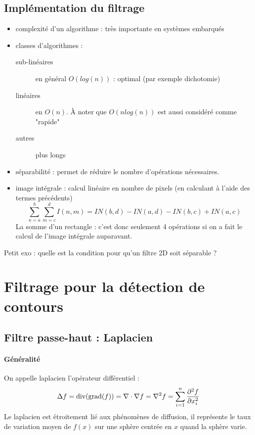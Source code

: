 \documentclass[main.tex]{subfiles}
\begin{document}
\subsection{Implémentation du filtrage}
\begin{itemize}
\item complexité d'un algorithme : très importante en systèmes embarqués
\item classes d'algorithmes :
\begin{description}
\item[sub-linéaires] en général $O(log(n))$ : optimal (par exemple dichotomie)
\item[linéaires] en $O(n)$. À noter que $O(nlog(n))$ est aussi considéré comme "rapide"
\item[autres] plus longs
\end{description}
\item séparabilité : permet de réduire le nombre d'opérations nécessaires.
\item image intégrale : calcul linéaire en nombre de pixels (en calculant à l'aide des termes précédents)
\[ \sum_{n=a}^b \sum_{m=c}^d I(n,m) = IN(b,d) - IN(a,d) - IN(b,c) + IN(a,c) \]
La somme d'un rectangle : c'est donc seulement 4 opérations si on a fait le calcul de l'image intégrale auparavant.
\end{itemize}

Petit exo : quelle est la condition pour qu'un filtre 2D soit séparable ?

\section{Filtrage pour la détection de contours}
\subsection{Filtre passe-haut : Laplacien}

\paragraph{Généralité}
\begin{defin}
  On appelle laplacien l'opérateur différentiel :
  \[
    \Delta f = \divv( \grad(f))  = \nabla\cdot \nabla f = \nabla^2 f  =  \sum_{i=1}^{n}\derivpp[f]{x_i}
  \]
  Le laplacien est  étroitement lié aux phénomènes de diffusion, il représente le taux de variation moyen de $f(x)$ sur une sphère centrée en $x$ quand la sphère varie.
\end{defin}
\end{document}
